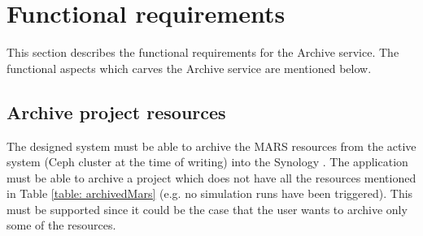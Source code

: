 
\section{Functional requirements}
    \label{section:functionalReq}
    This section describes the functional requirements for the Archive service.
    The functional aspects which carves the Archive service are mentioned below.

    \subsection{Archive project resources}
        The designed system must be able to archive the MARS resources from the active system (Ceph cluster at the time of writing) 
        into the Synology \cite{Synology}. The application must
        be able to archive a project which does not have all the resources mentioned in Table \ref{table: archivedMars} (e.g. no simulation runs have been triggered).
        This must be supported since it could be the case that the user wants to archive only some of the resources.
        
